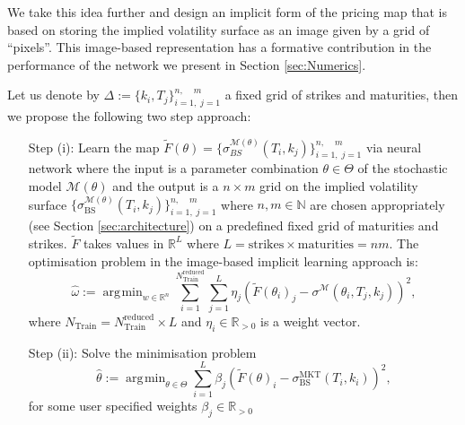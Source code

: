 \documentclass{article}
\theoremstyle{remark}
\DeclareMathOperator*{\argmin}{\arg\!\min}
\begin{document}
We take this idea further and design an implicit form of the pricing map that
is based on storing the implied volatility surface as an image given by a grid
of ``pixels''. This image-based representation has a formative contribution in
the performance of the network we present in Section \ref{sec:Numerics}. 

Let us denote by
$\Delta:=\{k_i,T_j\}_{i=1,\;j=1}^{n,\;\;\;\;m}$ a fixed grid of strikes and
maturities, then we propose the following two step approach:
\begin{enumerate}
\item[Step (i):] Learn the map
  $\widetilde{F}(\theta)=\{\sigma^{\mathcal{M}(\theta)}_{BS}(T_i,k_j)\}_{i=1,\;j=1}^{n,\;\;\;\;m}$
  via neural network where the input is a parameter combination
  $\theta\in\Theta$ of the stochastic model $\mathcal{M}(\theta)$ and the
  output is a $n\times m$ grid on the implied volatility surface
  $\{\sigma^{\mathcal{M}(\theta)}_{\mathrm{BS}}(T_i,k_j)\}_{i=1,\;j=1}^{n,\;\;\;\;m}$
  where $n,m\in\mathbb{N}$ are chosen appropriately (see Section
  \ref{sec:architecture}) on a predefined fixed grid of maturities and
  strikes. $\widetilde{F}$ takes values in $\mathbb{R}^L$  where
  $L=\textrm{strikes}\times \textrm{maturities} = nm$.
  The optimisation problem in the image-based implicit learning
  approach is:
  \begin{equation}\label{eq:gridbased_loss}
    \widehat{\omega}:=
    \argmin_{w\in\mathbb{R}^n}\sum_{i=1}^{N_{\mathrm{Train}}^{\mathrm{reduced}}}
    \sum_{j=1}^{L} \eta_j(\widetilde{F}(\theta_{i})_j-\sigma^{\mathcal{M}}(\theta_{i},T_j,k_j))^2, 
  \end{equation}
where 
$N_{\mathrm{Train}}=N_{\mathrm{Train}}^{\mathrm{reduced}} \times L$ and $\eta_i\in\mathbb{R}_{>0}$ is a weight vector.  
\item[Step (ii):] Solve the minimisation problem $$\widehat{\theta}:=\argmin_{\theta\in\Theta}\sum_{i=1}^L \beta_j(\widetilde{F}(\theta)_{i}-\sigma^{\mathrm{MKT}}_{\mathrm{BS}}(T_i,k_i))^2,$$ 
for some user specified weights $\beta_j\in\mathbb{R}_{>0}$
\end{enumerate}
\end{document}

